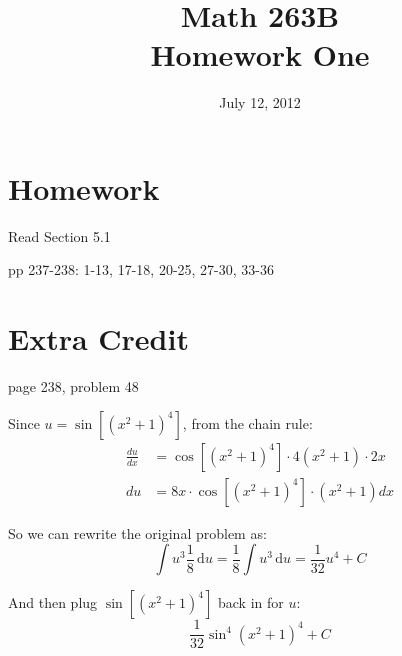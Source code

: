 \documentclass{exam}
\title{Math 263B \\ Homework One}
\date{July 12, 2012}
\begin{document}
\maketitle

\section{Homework}

\begin{itemize*}
  \item Read Section 5.1
  \item pp 237-238: 1-13, 17-18, 20-25, 27-30, 33-36
\end{itemize*}

\ifprintanswers
\pagebreak
\fi

\section{Extra Credit}
page 238, problem 48

\begin{solution}

Since $u = \sin[(x^2 + 1)^4]$, from the chain rule: 
\begin{align*}
  \frac{du}{dx} &= \cos \left[ \left( x^2 + 1 \right)^4 \right] \cdot 4 \left( x^2 + 1 \right) \cdot 2x \\
  du &= 8x \cdot \cos \left[ \left( x^2 + 1 \right)^4 \right] \cdot \left( x^2 + 1 \right) dx
\end{align*}

So we can rewrite the original problem as:
\[
  \int u^3 \frac{1}{8} \, \mathrm{d}u = \frac{1}{8} \int u^3 \, \mathrm{d}u = \frac{1}{32} u^4 + C
\]

And then plug $\sin \left[ \left( x^2 + 1 \right)^4 \right]$ back in for $u$:
\[
  \frac{1}{32} \sin^4 \left(x^2 + 1 \right)^4 + C
\]

\end{solution}

\ifprintanswers
\pagebreak
\end{document}
